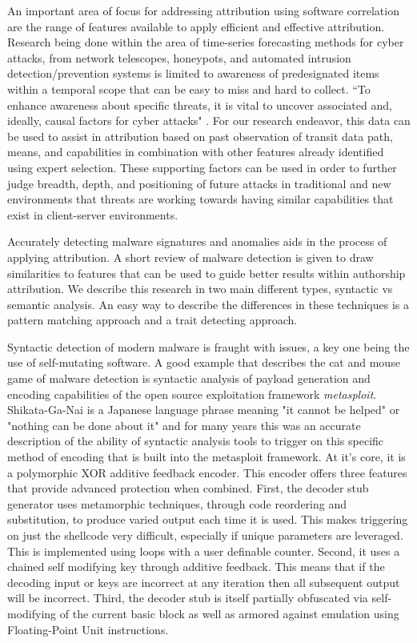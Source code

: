 \documentclass[12pt]{report}
\begin{document}
An important area of focus for addressing attribution using software correlation are the range of features available to apply efficient and effective attribution.  Research being done within the area of time-series forecasting methods for cyber attacks, from network telescopes, honeypots, and automated intrusion detection/prevention systems is limited to awareness of predesignated items within a temporal scope that can be easy to miss and hard to collect.  ``To enhance awareness about specific threats, it is vital to uncover associated and, ideally, causal factors for cyber attacks"  \cite{DBLP:journals/corr/BakdashHZMTSHD17}.  For our research endeavor, this data can be used to assist in attribution based on past observation of transit data path, means, and capabilities in combination with other features already identified using expert selection.  These supporting factors can be used in order to further judge breadth, depth, and positioning of future attacks in traditional and new environments that threats are working towards having similar capabilities that exist in client-server environments.

Accurately detecting malware signatures and anomalies aids in the process of applying attribution.  A short review of malware detection is given to draw similarities to features that can be used to guide better results within authorship attribution.  We describe this research in two main different types, syntactic vs semantic analysis.  An easy way to describe the differences in these techniques is a pattern matching approach and a trait detecting approach.

Syntactic detection of modern malware is fraught with issues, a key one being the use of self-mutating software.  A good example that describes the cat and mouse game of malware detection is syntactic analysis of payload generation and encoding capabilities of the open source exploitation framework \emph{metasploit}.  Shikata-Ga-Nai is a Japanese language phrase meaning "it cannot be helped" or "nothing can be done about it" and for many years this was an accurate description of the ability of syntactic analysis tools to trigger on this specific method of encoding that is built into the metasploit framework.  At it's core, it is a polymorphic XOR additive feedback encoder.  This encoder offers three features that provide advanced protection when combined.  First, the decoder stub generator uses metamorphic techniques, through code reordering and substitution, to produce varied output each time it is used.  This makes triggering on just the shellcode very difficult, especially if unique parameters are leveraged.  This is implemented using loops with a user definable counter.  Second, it uses a chained self modifying key through additive feedback. This means that if the decoding input or keys are incorrect at any iteration then all subsequent output will be incorrect.  Third, the decoder stub is itself partially obfuscated via self-modifying of the current basic block as well as armored against emulation using Floating-Point Unit instructions.  
\end{document}

